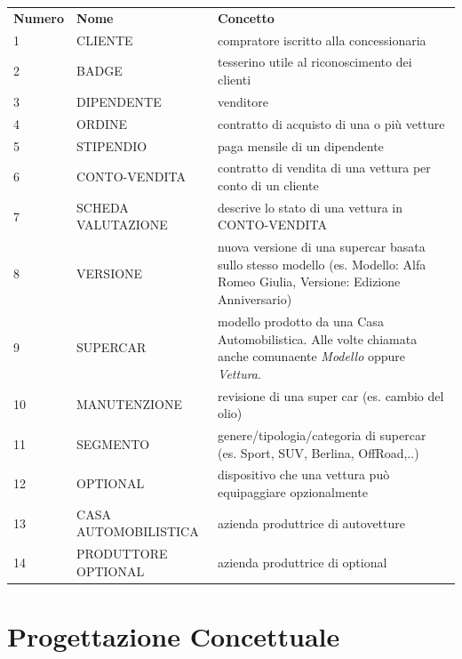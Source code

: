 \documentclass[11pt]{article}
\begin{document}
\renewcommand{\arraystretch}{1.5}

\begin{table}[htbp]
    \centering
    \small
    \begin{tabularx}{\linewidth}{l l X}
        \rowcolor{red!20!}
        \textbf{Numero} & \textbf{Nome} & \textbf{Concetto} \\
        1 & CLIENTE & compratore iscritto alla concessionaria \\
        2 & BADGE & tesserino utile al riconoscimento dei clienti \\
        3 & DIPENDENTE & venditore \\
        4 & ORDINE & contratto di acquisto di una o più vetture \\
        5 & STIPENDIO & paga mensile di un dipendente \\
        6 & CONTO-VENDITA & contratto di vendita di una vettura per conto
        di un cliente \\
        7 & SCHEDA VALUTAZIONE & descrive lo stato di una vettura in
        CONTO-VENDITA\\
        8 & VERSIONE & nuova versione di una supercar basata sullo stesso
        modello (es. Modello: Alfa Romeo Giulia, Versione: Edizione Anniversario) \\
        9 & SUPERCAR & modello prodotto da una Casa Automobilistica. Alle
        volte chiamata anche comunaente \textit{Modello} oppure \textit{Vettura}. \\
        10 & MANUTENZIONE & revisione di una super car (es. cambio del
        olio) \\
        11 & SEGMENTO & genere/tipologia/categoria di supercar (es. Sport, SUV, Berlina, OffRoad,..)\\
        12 & OPTIONAL & dispositivo che una vettura può equipaggiare
        opzionalmente \\
        13 & CASA AUTOMOBILISTICA & azienda produttrice di autovetture \\
        14 & PRODUTTORE OPTIONAL & azienda produttrice di optional \\
    \end{tabularx}
    \label{tab:tabella_linguaggio}
\end{table}

\section{Progettazione Concettuale}
\end{document}
